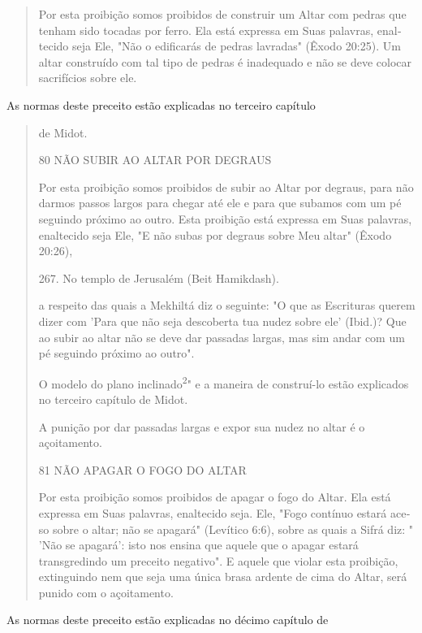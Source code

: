 \begin{quote}
Por esta proibição somos proibidos de construir um Altar com pe­dras que
tenham sido tocadas por ferro. Ela está expressa em Suas palavras,
enal­tecido seja Ele, "Não o edificarás de pedras lavradas" (Êxodo
20:25). Um altar construído com tal tipo de pedras é inadequado e não se
deve colocar sacrifí­cios sobre ele.
\end{quote}

As normas deste preceito estão explicadas no terceiro capítulo

\begin{quote}
de Midot.

80 NÃO SUBIR AO ALTAR POR DEGRAUS

Por esta proibição somos proibidos de subir ao Altar por degraus, para
não darmos passos largos para chegar até ele e para que subamos com um
pé seguindo próximo ao outro. Esta proibição está expressa em Suas
palavras, enaltecido seja Ele, "E não subas por degraus sobre Meu altar"
(Êxodo 20:26),

267. No templo de Jerusalém (Beit Hamikdash).

a respeito das quais a Mekhiltá diz o seguinte: "O que as Escrituras
querem di­zer com 'Para que não seja descoberta tua nudez sobre ele'
(Ibid.)? Que ao su­bir ao altar não se deve dar passadas largas, mas sim
andar com um pé seguindo próximo ao outro".

O modelo do plano inclinado\textsuperscript{2}" e a maneira de
construí-lo estão ex­plicados no terceiro capítulo de Midot.

A punição por dar passadas largas e expor sua nudez no altar é o
açoitamento.

81 NÃO APAGAR O FOGO DO ALTAR

Por esta proibição somos proibidos de apagar o fogo do Altar. Ela está
expressa em Suas palavras, enaltecido seja. Ele, "Fogo contínuo estará
ace­so sobre o altar; não se apagará" (Levítico 6:6), sobre as quais a
Sifrá diz: " 'Não se apagará': isto nos ensina que aquele que o apagar
estará transgredindo um preceito negativo". E aquele que violar esta
proibição, extinguindo nem que seja uma única brasa ardente de cima do
Altar, será punido com o açoitamento.
\end{quote}

As normas deste preceito estão explicadas no décimo capítulo de

